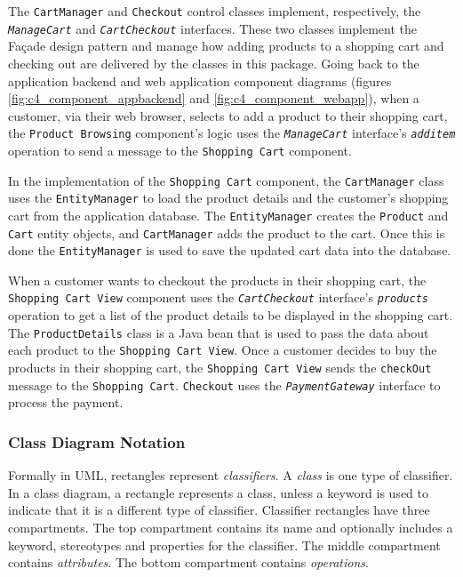 \noindent
The \texttt{CartManager} and \texttt{Checkout} control classes implement, respectively,
the \texttt{\textsl{ManageCart}} and \texttt{\textsl{Cart\-Check\-out}} interfaces.
These two classes implement the Façade design pattern and manage how
adding products to a shopping cart and checking out are delivered by the classes in this package.
Going back to the application backend and web application component diagrams
(figures \ref{fig:c4_component_appbackend} and \ref{fig:c4_component_webapp}),
when a customer, via their web browser, selects to add a product to their shopping cart,
the \texttt{Product Browsing} component's logic uses the \texttt{\textsl{ManageCart}}
interface's \texttt{\textsl{additem}} operation to send a message to the \texttt{Shopping Cart} component.

In the implementation of the \texttt{Shopping Cart} component,
the \texttt{CartManager} class uses the \texttt{EntityManager}
to load the product details and the customer's shopping cart from the application database.
The \texttt{EntityManager} creates the \texttt{Product} and \texttt{Cart} entity objects,
and \texttt{CartManager} adds the product to the cart.
Once this is done the \texttt{EntityManager} is used to save the updated cart data into the database.

When a customer wants to checkout the products in their shopping cart, the \texttt{Shopping Cart View} component
uses the \texttt{\textsl{CartCheckout}} interface's \texttt{\textsl{products}} operation
to get a list of the product details to be displayed in the shopping cart.
The \texttt{ProductDetails} class is a Java bean that is used to pass the data about each product to the \texttt{Shopping Cart View}.
Once a customer decides to buy the products in their shopping cart,
the \texttt{Shopping Cart View} sends the \texttt{checkOut} message to the \texttt{Shopping Cart}.
\texttt{Checkout} uses the \texttt{\textsl{PaymentGateway}} interface to process the payment.

\subsubsection{Class Diagram Notation}\label{sec:classNotation}
Formally in UML, rectangles represent \emph{classifiers}. A \emph{class} is one type of classifier.
In a class diagram, a rectangle represents a class, unless a keyword is used to indicate that it is a different type of classifier.
Classifier rectangles have three compartments.
The top compartment contains its name and optionally includes a keyword, stereotypes and properties for the classifier.
The middle compartment contains \emph{attributes}.
The bottom compartment contains \emph{operations}.

